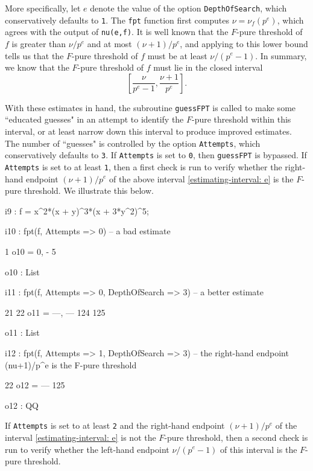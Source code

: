 \documentclass{amsart}
\begin{document}
More specifically, let $e$ denote the value of the option \texttt{DepthOfSearch}, which conservatively defaults to \texttt{1}.  The \texttt{fpt} function first computes $\nu=\nu_f(p^e)$, which agrees with the output of \texttt{nu(e,f)}.  It is well known that the $F$-pure threshold of $f$ is greater than $\nu/p^e$ and at most $(\nu+1)/p^e$, and applying  \cite[Proposition 4.2]{HernandezFPurityOfHypersurfaces} to this lower bound tells us that the $F$-pure threshold of $f$ must be at least $\nu/(p^e-1)$.  In summary, we know that the $F$-pure threshold of $f$ must lie in the closed interval
%
\begin{equation}
\label{estimating-interval: e}
\tag{$\dagger$}
\left[ \frac{\nu}{p^e-1}, \frac{\nu+1}{p^e} \right].
\end{equation}

With these estimates in hand, the subroutine \texttt{guessFPT} is called to make some ``educated guesses" in an attempt to identify the $F$-pure threshold within this interval, or at least narrow down this interval to produce improved estimates.  The number of ``guesses" is controlled by the option \texttt{Attempts}, which conservatively defaults to \texttt{3}.  If \texttt{Attempts} is set to \texttt{0}, then \texttt{guessFPT} is bypassed. If  \texttt{Attempts} is set to at least \texttt{1}, then a first check is run to verify whether the right-hand endpoint $(\nu+1)/p^e$ of the above interval \eqref{estimating-interval: e} is the $F$-pure threshold.  We illustrate this below.

\bigskip
{\small
{}
\begin{MyVerbatim}
i9 : f = x^2*(x + y)^3*(x + 3*y^2)^5;

i10 : fpt(f, Attempts => 0) -- a bad estimate

          1
o10 = {0, -}
          5

o10 : List

i11 : fpt(f, Attempts => 0, DepthOfSearch => 3) -- a better estimate

        21   22
o11 = {---, ---}
       124  125

o11 : List

i12 : fpt(f, Attempts => 1, DepthOfSearch => 3) -- the right-hand
      endpoint (nu+1)/p^e is the F-pure threshold

       22
o12 = ---
      125

o12 : QQ
\end{MyVerbatim}
}

If  \texttt{Attempts} is set to at least \texttt{2} and the right-hand endpoint $(\nu+1)/p^e$ of the interval \eqref{estimating-interval: e} is not the $F$-pure threshold, then a second check is run to verify whether the left-hand endpoint $\nu/(p^e-1)$ of this interval is the $F$-pure threshold.
\end{document}

